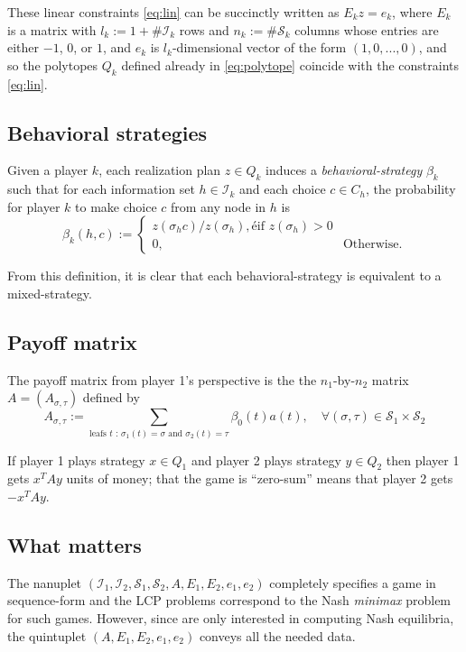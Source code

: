 \documentclass{article} %
\begin{document}
These linear constraints \eqref{eq:lin} can be succinctly written as $E_k z = e_k$,
where $E_k$ is a matrix with $l_k := 1 + \#\mathcal{I}_k$ rows and $n_k := \#\mathcal{S}_k$ columns whose entries are either $-1$, $0$, or $1$, and $e_k$ is $l_k$-dimensional vector of the form $(1, 0, ..., 0)$, and so the polytopes $Q_k$ defined already in \eqref{eq:polytope} coincide with the constraints \eqref{eq:lin}.

\subsection{Behavioral strategies}
Given a player $k$, each realization plan $z \in Q_k$ induces a \textit{behavioral-strategy} $\beta_k$ such that for each information set $h \in \mathcal{I}_k$ and each choice $c \in C_h$, the probability for player $k$ to make choice $c$ from any node in $h$ is
\begin{equation}
  \beta_k(h, c) := \begin{cases}
    z(\sigma_hc)/z(\sigma_h), é\mbox{if } z(\sigma_h) > 0\\
    0, &\mbox{Otherwise}.
  \end{cases}
\end{equation}

From this definition, it is clear that each behavioral-strategy is equivalent to a mixed-strategy.

\subsection{Payoff matrix}
The payoff matrix from player 1's perspective is the the $n_1$-by-$n_2$ matrix $A = (A_{\sigma,\tau})$ defined by
\begin{equation}
    A_{\sigma,\tau} := \sum_{\text{leafs }t\text{ : } \sigma_1(t) = \sigma\text{ and } \sigma_2(t) = \tau}{\beta_0(t)a(t)}, \hspace{1em} \forall (\sigma, \tau) \in \mathcal{S}_1 \times \mathcal{S}_2
  \end{equation}

If player 1 plays strategy $x \in Q_1$ and player 2 plays strategy $y \in Q_2$ then player 1 gets $x^TAy$ units of money; that the game is ``zero-sum'' means that player 2 gets $-x^TAy$.

\subsection{What matters}
The nanuplet $(\mathcal{I}_1, \mathcal{I}_2, \mathcal{S}_1, \mathcal{S}_2, A, E_1, E_2, e_1, e_2)$ completely specifies a game in sequence-form and the LCP problems correspond to the Nash \textit{minimax} problem for such games. However, since are only interested in computing Nash equilibria, the quintuplet $(A, E_1, E_2, e_1, e_2)$ conveys all the needed data.
\end{document}
